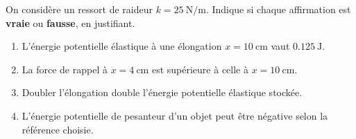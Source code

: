 \documentclass[11pt,a4paper]{article}
\begin{document}
\begin{exo}
On considère un ressort de raideur $k=\qty{25}{\newton\per\metre}$. Indique si chaque affirmation est
\textbf{vraie} ou \textbf{fausse}, en justifiant.
\begin{enumerate}[label=\alph*)]
  \item L'énergie potentielle élastique à une élongation $x=\qty{10}{\centi\metre}$ vaut
        $\qty{0,125}{\joule}$.
  \item La force de rappel à $x=\qty{4}{\centi\metre}$ est supérieure à celle à $x=\qty{10}{\centi\metre}$.
  \item Doubler l'élongation double l'énergie potentielle élastique stockée.
  \item L'énergie potentielle de pesanteur d'un objet peut être négative selon la référence choisie.
\end{enumerate}
\end{exo}
\end{document}
